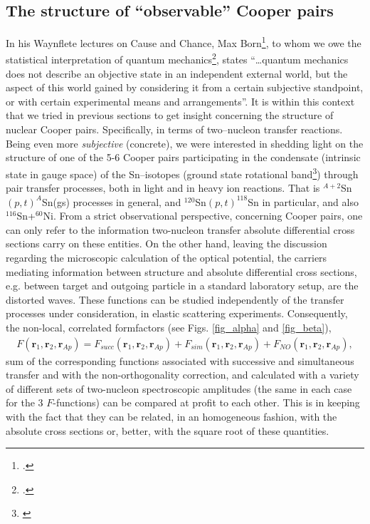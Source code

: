 \subsection{The structure of ``observable'' Cooper pairs}\label{S6.5.4}
In his Waynflete lectures on Cause and Chance, Max Born\footnote{\cite{Born:48}.}, to whom we owe the statistical interpretation of quantum mechanics\footnote{\cite{Born:64,Pais:86}.}, states ``\dots quantum mechanics does not describe an objective state in an independent external world, but the aspect of this world gained by considering it from a certain subjective standpoint, or with certain experimental means and arrangements''. It is within this context that we tried in previous sections to get insight concerning the structure of nuclear Cooper pairs. Specifically, in terms of two--nucleon transfer reactions. Being even more \textit{subjective} (concrete), we were interested in shedding light on the structure of one of the 5-6 Cooper pairs participating in the condensate (intrinsic state in gauge space) of the Sn--isotopes (ground state rotational band\footnote{\cite{Potel:13b,Potel:17}}) through pair transfer processes, both in light and in heavy ion reactions. That is $^{A+2}$Sn$(p,t)^{A}$Sn(gs) processes in general, and $^{120}$Sn$(p,t)^{118}$Sn in particular, and also $^{116}$Sn+$^{60}$Ni. From a strict observational perspective, concerning Cooper pairs, one can only refer to the information two-nucleon transfer absolute differential cross sections carry on these entities. On the other hand, leaving the discussion regarding the microscopic calculation of the optical potential, the carriers mediating information between structure and absolute differential cross sections, e.g. between target and outgoing particle in a standard laboratory setup, are the distorted waves. These functions can be studied independently of the transfer processes under consideration, in elastic scattering experiments. Consequently, the non-local, correlated formfactors (see Figs. \ref{fig_alpha} and \ref{fig_beta}),
\begin{align}\label{eq6.6.1}
F(\mathbf r_1,\mathbf r_2,\mathbf r_{Ap})=F_{succ}(\mathbf r_1,\mathbf r_2,\mathbf r_{Ap})+F_{sim}(\mathbf r_1,\mathbf r_2,\mathbf r_{Ap})+F_{NO}(\mathbf r_1,\mathbf r_2,\mathbf r_{Ap}),
\end{align}
sum of the corresponding functions associated with successive and simultaneous transfer  and with the non-orthogonality correction, and calculated with a variety of different sets of two-nucleon spectroscopic amplitudes (the same in each case for the 3 $F$-functions) can be compared at profit to each other. This is in keeping with the fact that they can be related, in an homogeneous fashion, with the absolute cross sections or, better, with the square root of these quantities. 

